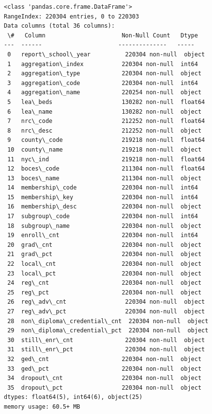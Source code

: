 \documentclass[11pt]{article}
\begin{document}
    \begin{Verbatim}[commandchars=\\\{\}]
<class 'pandas.core.frame.DataFrame'>
RangeIndex: 220304 entries, 0 to 220303
Data columns (total 36 columns):
 \#   Column                      Non-Null Count   Dtype
---  ------                      --------------   -----
 0   report\_school\_year          220304 non-null  object
 1   aggregation\_index           220304 non-null  int64
 2   aggregation\_type            220304 non-null  object
 3   aggregation\_code            220304 non-null  int64
 4   aggregation\_name            220254 non-null  object
 5   lea\_beds                    130282 non-null  float64
 6   lea\_name                    130282 non-null  object
 7   nrc\_code                    212252 non-null  float64
 8   nrc\_desc                    212252 non-null  object
 9   county\_code                 219218 non-null  float64
 10  county\_name                 219218 non-null  object
 11  nyc\_ind                     219218 non-null  float64
 12  boces\_code                  211304 non-null  float64
 13  boces\_name                  211304 non-null  object
 14  membership\_code             220304 non-null  int64
 15  membership\_key              220304 non-null  int64
 16  membership\_desc             220304 non-null  object
 17  subgroup\_code               220304 non-null  int64
 18  subgroup\_name               220304 non-null  object
 19  enroll\_cnt                  220304 non-null  int64
 20  grad\_cnt                    220304 non-null  object
 21  grad\_pct                    220304 non-null  object
 22  local\_cnt                   220304 non-null  object
 23  local\_pct                   220304 non-null  object
 24  reg\_cnt                     220304 non-null  object
 25  reg\_pct                     220304 non-null  object
 26  reg\_adv\_cnt                 220304 non-null  object
 27  reg\_adv\_pct                 220304 non-null  object
 28  non\_diploma\_credential\_cnt  220304 non-null  object
 29  non\_diploma\_credential\_pct  220304 non-null  object
 30  still\_enr\_cnt               220304 non-null  object
 31  still\_enr\_pct               220304 non-null  object
 32  ged\_cnt                     220304 non-null  object
 33  ged\_pct                     220304 non-null  object
 34  dropout\_cnt                 220304 non-null  object
 35  dropout\_pct                 220304 non-null  object
dtypes: float64(5), int64(6), object(25)
memory usage: 60.5+ MB
    \end{Verbatim}
\end{document}
